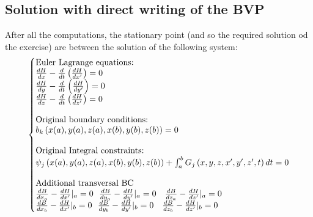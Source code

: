 \documentclass[a4paper,12pt]{article}
\makeatletter
\newenvironment{sistema}%
{\left\lbrace\begin{array}{@{}l@{}}}%
	{\end{array}\right.}
\makeatother
\begin{document}
\subsection{Solution with direct writing of the BVP}
	After all the computations, the stationary point (and so the required solution od the exercise) are between the solution of the following system:
	\begin{equation}
	\begin{sistema}
		\text{Euler Lagrange equations:}\\
		\frac{dH}{dx}-\frac{d}{dt}\left(\frac{dH}{dx'}\right)=0\\
		\frac{dH}{dy}-\frac{d}{dt}\left(\frac{dH}{dy'}\right)=0\\
		\frac{dH}{dz}-\frac{d}{dt}\left(\frac{dH}{dz'}\right)=0\\ \\
		\text{Original boundary conditions:}\\
		b_k \left( x(a),y(a),z(a),x(b),y(b),z(b) \right) = 0\\ \\
		\text{Original Integral constraints:}\\
		\psi_j\left( x(a),y(a),z(a),x(b),y(b),z(b) \right)+\int_a^b G_j \left( x,y,z,x',y',z',t \right)dt  = 0\\ \\
		\text{Additional transversal BC}\\
		\frac{dB}{dx_a}-\frac{dH}{dx'}|_a=0 \ \ \frac{dB}{dy_a}-\frac{dH}{dy'}|_a=0 \ \ \ \frac{dB}{dz_a}-\frac{dH}{dz'}|_a=0\\
		\frac{dB}{dx_b}-\frac{dH}{dx'}|_b=0 \ \ \frac{dB}{dy_b}-\frac{dH}{dy'}|_b=0 \ \ \ \frac{dB}{dz_b}-\frac{dH}{dz'}|_b=0\\
	\end{sistema}
	\end{equation}
	
\end{document}
